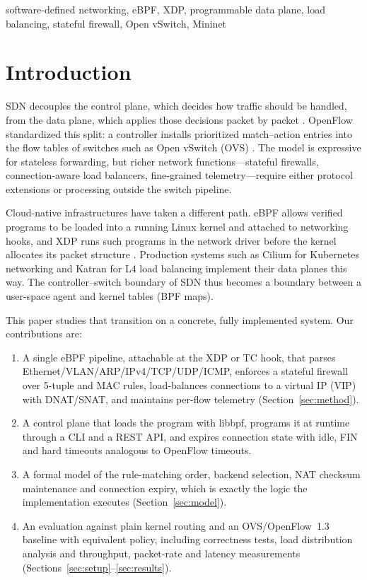 \documentclass[conference]{IEEEtran}
\begin{document}
\begin{IEEEkeywords}
software-defined networking, eBPF, XDP, programmable data plane, load
balancing, stateful firewall, Open vSwitch, Mininet
\end{IEEEkeywords}

\section{Introduction}
SDN decouples the control plane, which decides how traffic should be handled,
from the data plane, which applies those decisions packet by packet
\cite{kreutz2015sdn,feamster2014road}. OpenFlow \cite{mckeown2008openflow}
standardized this split: a controller installs prioritized match--action
entries into the flow tables of switches such as Open vSwitch (OVS)
\cite{pfaff2015ovs}. The model is expressive for stateless forwarding, but
richer network functions---stateful firewalls, connection-aware load
balancers, fine-grained telemetry---require either protocol extensions or
processing outside the switch pipeline.

Cloud-native infrastructures have taken a different path. eBPF allows verified
programs to be loaded into a running Linux kernel and attached to networking
hooks, and XDP runs such programs in the network driver before the kernel
allocates its packet structure \cite{hoiland2018xdp,vieira2020ebpf}.
Production systems such as Cilium for Kubernetes networking
\cite{cilium} and Katran for L4 load balancing \cite{katran} implement their
data planes this way. The controller--switch boundary of SDN thus becomes a
boundary between a user-space agent and kernel tables (BPF maps).

This paper studies that transition on a concrete, fully implemented system.
Our contributions are:
\begin{enumerate}
\item A single eBPF pipeline, attachable at the XDP or TC hook, that parses
Ethernet/VLAN/ARP/IPv4/TCP/UDP/ICMP, enforces a stateful firewall over
5-tuple and MAC rules, load-balances connections to a virtual IP (VIP) with
DNAT/SNAT, and maintains per-flow telemetry (Section~\ref{sec:method}).
\item A control plane that loads the program with libbpf, programs it at
runtime through a CLI and a REST API, and expires connection state with idle,
FIN and hard timeouts analogous to OpenFlow timeouts.
\item A formal model of the rule-matching order, backend selection, NAT
checksum maintenance and connection expiry, which is exactly the logic the
implementation executes (Section~\ref{sec:model}).
\item An evaluation against plain kernel routing and an OVS/OpenFlow~1.3
baseline with equivalent policy, including correctness tests, load
distribution analysis and throughput, packet-rate and latency measurements
(Sections~\ref{sec:setup}--\ref{sec:results}).
\end{enumerate}
\end{document}
